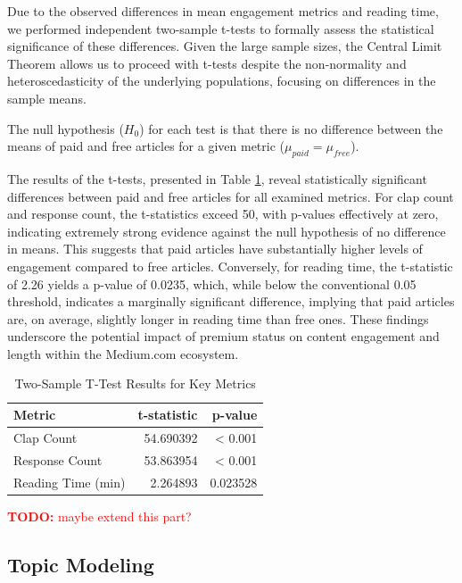 \documentclass[11pt,a4paper]{article}
\newcommand{\todo}[1]{\textcolor{red}{\textbf{TODO:} #1}}
\begin{document}
Due to the observed differences in mean engagement metrics and reading time, we performed independent two-sample t-tests to formally assess the statistical significance of these differences. Given the large sample sizes, the Central Limit Theorem allows us to proceed with t-tests despite the non-normality and heteroscedasticity of the underlying populations, focusing on differences in the sample means.

The null hypothesis ($H_0$) for each test is that there is no difference between the means of paid and free articles for a given metric ($\mu_{paid} = \mu_{free}$).

The results of the t-tests, presented in Table \ref{tab:t_test_results}, reveal statistically significant differences between paid and free articles for all examined metrics. For clap count and response count, the t-statistics exceed 50, with p-values effectively at zero, indicating extremely strong evidence against the null hypothesis of no difference in means. This suggests that paid articles have substantially higher levels of engagement compared to free articles. Conversely, for reading time, the t-statistic of 2.26 yields a p-value of 0.0235, which, while below the conventional 0.05 threshold, indicates a marginally significant difference, implying that paid articles are, on average, slightly longer in reading time than free ones. These findings underscore the potential impact of premium status on content engagement and length within the Medium.com ecosystem.

\begin{table}[H]
    \centering
    \caption{Two-Sample T-Test Results for Key Metrics}
    \label{tab:t_test_results}
    \begin{tabular}{lrr}
        \toprule
        \textbf{Metric} & \textbf{t-statistic} & \textbf{p-value} \\
        \midrule
        Clap Count & 54.690392 & < 0.001 \\
        Response Count & 53.863954 & < 0.001 \\
        Reading Time (min) & 2.264893 & 0.023528 \\
        \bottomrule
    \end{tabular}
\end{table}

\todo{maybe extend this part?}

\subsection{Topic Modeling}
\end{document}
